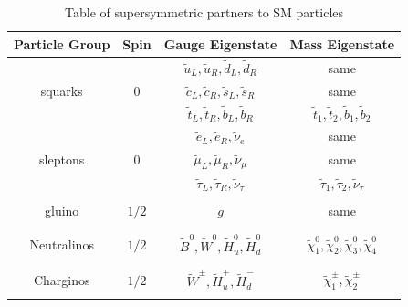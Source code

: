 \begin{table}[H]
\begin{center}
\begin{tabular}{ c c c c }
\toprule
Particle Group    & Spin     & Gauge Eigenstate     & Mass Eigenstate \\
\midrule 
\vspace{3mm}
        &         & $\tilde{u}_{L}, \tilde{u}_{R}, \tilde{d}_{L}, \tilde{d}_{R}$    & same    \\
\vspace{3mm}
squarks     & $0$    & $\tilde{c}_{L}, \tilde{c}_{R}, \tilde{s}_{L}, \tilde{s}_{R}$    & same    \\
\vspace{3mm}
        &         & $\tilde{t}_{L}, \tilde{t}_{R}, \tilde{b}_{L}, \tilde{b}_{R}$    & $\tilde{t}_{1}, \tilde{t}_{2}, \tilde{b}_{1}, \tilde{b}_{2}$    \\

\hline 

\vspace{3mm}
        &         & $\tilde{e}_{L}, \tilde{e}_{R}, \tilde{\nu}_{e}$        & same    \\
\vspace{3mm}
sleptons     & $0$    & $\tilde{\mu}_{L}, \tilde{\mu}_{R}, \tilde{\nu}_{\mu}$    & same    \\
\vspace{3mm}
        &         & $\tilde{\tau}_{L}, \tilde{\tau}_{R}, \tilde{\nu}_{\tau}$    & $\tilde{\tau}_{1}, \tilde{\tau}_{2}, \tilde{\nu}_{\tau}$    \\    
        
\hline \\

gluino    & $1/2$    & $\tilde{g}$    &    same \\
\\
\hline \\

Neutralinos    & $1/2$    & $\tilde{B}^{0}, \tilde{W}^{0}, \tilde{H}^{0}_{u}, \tilde{H}^{0}_{d}$& $\tilde{\chi}^{0}_{1}, \tilde{\chi}^{0}_{2}, \tilde{\chi}^{0}_{3}, \tilde{\chi}^{0}_{4}$ \\
\\
\hline \\

Charginos        & $1/2$    & $\tilde{W}^{\pm}, \tilde{H}^{+}_{u}, \tilde{H}^{-}_{d}$& $\tilde{\chi}^{\pm}_{1}, \tilde{\chi}^{\pm}_{2}$ \\
\\
\bottomrule
\end{tabular}
\caption{Table of supersymmetric partners to SM particles}
\label{tab:MSSMParticles}
\end{center}
\end{table}

